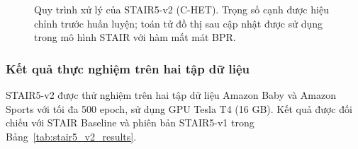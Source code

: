 \begin{figure}[!htbp]

    \caption{
        Quy trình xử lý của STAIR5-v2 (C-HET).
        Trọng số cạnh được hiệu chỉnh trước huấn luyện;
        toán tử đồ thị sau cập nhật được sử dụng
        trong mô hình STAIR với hàm mất mát BPR.
    }

    \label{fig:stair5_v2_architecture}
\end{figure}



\subsubsection{Kết quả thực nghiệm trên hai tập dữ liệu}

STAIR5-v2 được thử nghiệm trên hai tập dữ liệu
Amazon Baby và Amazon Sports với tối đa 500 epoch,
sử dụng GPU Tesla T4 (16 GB).
Kết quả được đối chiếu với STAIR Baseline
và phiên bản STAIR5-v1 trong
Bảng~\ref{tab:stair5_v2_results}.

